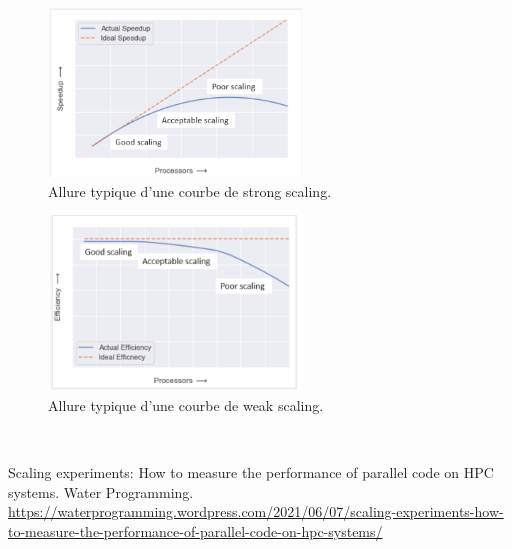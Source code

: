 \documentclass[a4paper,12pt]{article}
\begin{document}
\begin{figure}[h]
    \centering
    \includegraphics[width=0.6\textwidth]{3.png}
    \caption{Allure typique d’une courbe de strong scaling.}
    \label{strong}
\end{figure}

\begin{figure}[h]
    \centering
    \includegraphics[width=0.6\textwidth]{4.png}
    \caption{Allure typique d’une courbe de weak scaling.}
    \label{weak}
\end{figure}
\\
\newpage
\begin{thebibliography}{9}
     Scaling experiments: How to measure the performance of parallel code on HPC systems. Water Programming. \href{https://waterprogramming.wordpress.com/2021/06/07/scaling-experiments-how-to-measure-the-performance-of-parallel-code-on-hpc-systems/}{https://waterprogramming.wordpress.com/2021/06/07/scaling-experiments-how-to-measure-the-performance-of-parallel-code-on-hpc-systems/}
\end{thebibliography}
\end{document}
